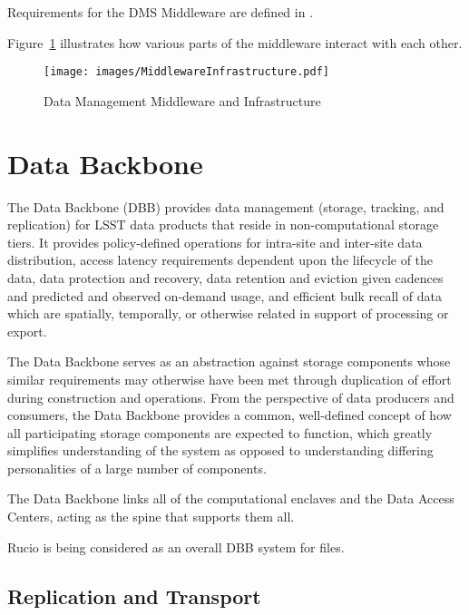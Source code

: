 \documentclass[DM,lsstdraft,toc]{lsstdoc}
\begin{document}
Requirements for the DMS Middleware are defined in .

Figure~\ref{fig:mwandinfra} illustrates how various parts of the middleware
interact with each other.

\begin{figure}
\centering
\texttt{[image: images/MiddlewareInfrastructure.pdf]}
\caption{Data Management Middleware and Infrastructure}
\label{fig:mwandinfra}
\end{figure}

\section{Data Backbone}\label{data-backbone}

The Data Backbone (DBB) provides data management (storage, tracking, and
replication) for LSST data products that reside in non-computational storage
tiers.  It provides policy-defined operations for intra-site and inter-site
data distribution, access latency requirements dependent upon the lifecycle of
the data, data protection and recovery, data retention and eviction given
cadences and predicted and observed on-demand usage, and efficient bulk recall
of data which are spatially, temporally, or otherwise related in support of
processing or export.

The Data Backbone serves as an abstraction against storage components whose
similar requirements may otherwise have been met through duplication of effort
during construction and operations. From the perspective of data producers and
consumers, the Data Backbone provides a common, well-defined concept of how all
participating storage components are expected to function, which greatly
simplifies understanding of the system as opposed to understanding differing
personalities of a large number of components.

The Data Backbone links all of the computational enclaves and the Data Access
Centers, acting as the spine that supports them all.

Rucio \citep{Rucio} is being considered as an overall DBB system for files.

\subsection{Replication and Transport}\label{dbb-replication-and-transport}
\end{document}
